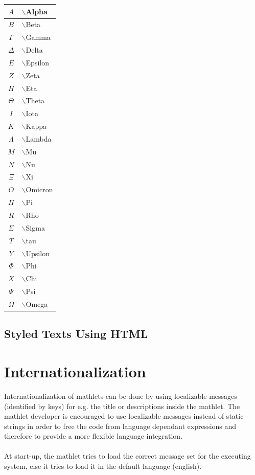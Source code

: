 \begin{center}
\begin{tabular}{|c|l|}
    $A$ & $\backslash$Alpha\\ \hline
    $B$ & $\backslash$Beta\\ \hline
    $\Gamma$ & $\backslash$Gamma\\ \hline
    $\Delta$ & $\backslash$Delta\\ \hline
    $E$ & $\backslash$Epsilon\\ \hline
    $Z$ & $\backslash$Zeta\\ \hline
    $H$ & $\backslash$Eta\\ \hline
    $\Theta$ & $\backslash$Theta\\ \hline
    $I$ & $\backslash$Iota\\ \hline
    $K$ & $\backslash$Kappa\\ \hline
    $\Lambda$ & $\backslash$Lambda\\ \hline
    $M$ & $\backslash$Mu\\ \hline
    $N$ & $\backslash$Nu\\ \hline
    $\Xi$ & $\backslash$Xi\\ \hline
    $O$ & $\backslash$Omicron\\ \hline
    $\Pi$ & $\backslash$Pi\\ \hline
    $R$ & $\backslash$Rho\\ \hline
    $\Sigma$ & $\backslash$Sigma\\ \hline
    $T$ & $\backslash$tau\\ \hline
    $Y$ & $\backslash$Upsilon\\ \hline
    $\Phi$ & $\backslash$Phi\\ \hline
    $X$ & $\backslash$Chi\\ \hline
    $\Psi$ & $\backslash$Psi\\ \hline
    $\Omega$ & $\backslash$Omega\\ \hline
  \end{tabular}
\end{center}


\subsection{Styled Texts Using HTML}


\newpage
\section{Internationalization}
  Internationalization of mathlets can be done by using localizable messages (identified
  by keys) for e.g. the title or descriptions inside the mathlet.
  The mathlet developer is encouraged to use localizable messages instead of static
  strings in order to free the code from language dependant expressions
  and therefore to provide a more flexible language integration.\\\\
  At start-up, the mathlet tries to load the correct message set for the executing system,
  else it tries to load it in the default language (english).
  
